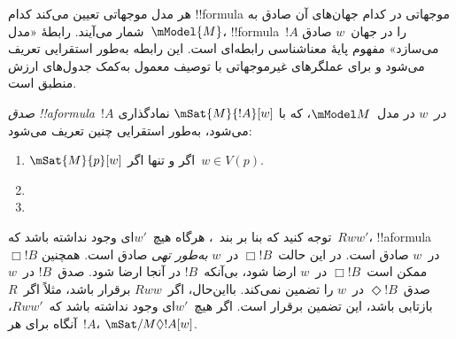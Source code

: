 \documentclass[../../../include/open-logic-section]{subfiles}
\begin{document}


هر مدل موجهاتی تعیین می‌کند کدام !!{formula} موجهاتی در کدام جهان‌های
آن صادق به شمار می‌آیند. رابطهٔ «مدل~$\mModel{M}$، !!{formula}~$!A$ را
در جهان~$w$ صادق می‌سازد» مفهوم پایهٔ معناشناسی رابطه‌ای است. این رابطه
به‌طور استقرایی تعریف می‌شود و برای عملگرهای غیرموجهاتی با توصیف معمول
به‌کمک جدول‌های ارزش منطبق است.

\begin{defn}
  \emph{صدق !!a{formula}~$!A$ در~$w$} در مدل~$\mModel M$، که با
  $\mSat{M}{!A}[w]$ نمادگذاری می‌شود، به‌طور استقرایی چنین تعریف می‌شود:
  \begin{enumerate}
  \item $\mSat{M}{p}[w]$ اگر و تنها اگر~$w \in V(p)$.
  \item{}
  \item{}
  \end{enumerate}
\end{defn}

توجه کنید که بنا بر بند~، هرگاه هیچ~$w'$ای
وجود نداشته باشد که~$Rww'$، !!a{formula}~$\Box !B$ در~$w$ صادق است.
در این حالت~$\Box !B$ در~$w$ \emph{به‌طور تهی} صادق است. همچنین ممکن
است~$\Box !B$ در~$w$ ارضا شود، بی‌آنکه~$!B$ در آنجا ارضا شود. صدق~$!B$
در~$w$ صدق~$\Diamond !B$ در~$w$ را تضمین نمی‌کند. بااین‌حال، اگر~$Rww$
برقرار باشد، مثلاً اگر~$R$ بازتابی باشد، این تضمین برقرار است. اگر
هیچ~$w'$ای وجود نداشته باشد که~$Rww'$، آنگاه برای هر~$!A$،
$\mSat/{M}{\Diamond !A}[w]$.
\end{document}
